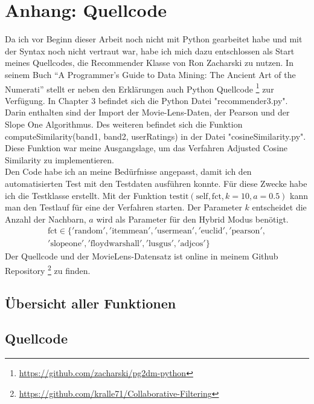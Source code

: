 \newpage
\appendix
\section{Anhang: Quellcode}

Da ich vor Beginn dieser Arbeit noch nicht mit Python gearbeitet habe und mit der Syntax noch nicht vertraut war, habe ich mich dazu entschlossen als Start meines Quellcodes, die Recommender Klasse von Ron Zacharski zu nutzen. In seinem Buch "`A Programmer's Guide to Data Mining: The Ancient Art of the Numerati"' \cite{G2DM} stellt er neben den Erklärungen auch Python Quellcode \footnote{\url{https://github.com/zacharski/pg2dm-python}} zur Verfügung. In Chapter 3 befindet sich die Python Datei "recommender3.py". Darin enthalten sind der Import der Movie-Lens-Daten, der Pearson und der Slope One Algorithmus. Des weiteren befindet sich die Funktion computeSimilarity(band1, band2, userRatings) in der Datei "cosineSimilarity.py". Diese Funktion war meine Ausgangslage, um das Verfahren Adjusted Cosine Similarity zu implementieren.\\
Den Code habe ich an meine Bedürfnisse angepasst, damit ich den automatisierten Test mit den Testdaten ausführen konnte. Für diese Zwecke habe ich die Testklasse erstellt. Mit der Funktion $\mathrm{testit}(\mathrm{self}, \mathrm{fct}, k=10, a=0.5)$ kann man den Testlauf für eine der Verfahren starten. Der Parameter $k$ entscheidet die Anzahl der Nachbarn, $a$ wird als Parameter für den Hybrid Modus benötigt. 
\begin{equation}
\begin{aligned}
\mathrm{fct} \in \{\mathrm{'random', 'itemmean', 'usermean', 'euclid', 'pearson',}\\ \mathrm{'slopeone', 'floydwarshall', 'lusgus', 'adjcos'}\}
\end{aligned}
\end{equation}
Der Quellcode und der MovieLens-Datensatz ist online in meinem Github Repository \footnote{\url{https://github.com/kralle71/Collaborative-Filtering}} zu finden.


\subsection{Übersicht aller Funktionen} \label{anhang:übersicht}
\lstset{%
	breaklines=true
}


\clearpage

\subsection{Quellcode} \label{anhang:quellcode}




\clearpage